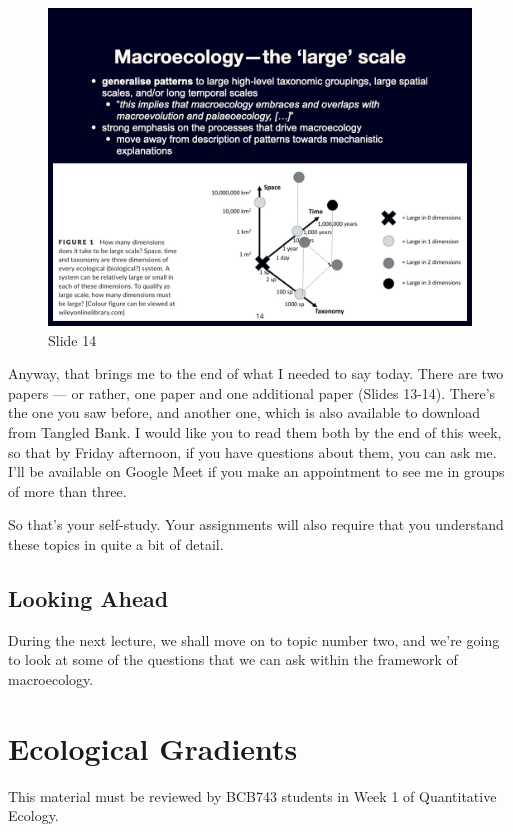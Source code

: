 \documentclass[
  11pt,
]{book}
\begin{document}
\begin{figure}[ht]
\centering
\includegraphics[width=0.8\linewidth]{../images/BDC334/BDC334-014.jpeg}
\caption*{Slide 14}
\end{figure}

Anyway, that brings me to the end of what I needed to say today. There
are two papers --- or rather, one paper and one additional paper (Slides
13-14). There's the one you saw before, and another one, which is also
available to download from Tangled Bank. I would like you to read them
both by the end of this week, so that by Friday afternoon, if you have
questions about them, you can ask me. I'll be available on Google Meet
if you make an appointment to see me in groups of more than three.

So that's your self-study. Your assignments will also require that you
understand these topics in quite a bit of detail.

\section{Looking Ahead}\label{looking-ahead}

During the next lecture, we shall move on to topic number two, and we're
going to look at some of the questions that we can ask within the
framework of macroecology.

\chapter{Ecological Gradients}\label{ecological-gradients}

\begin{tcolorbox}[enhanced jigsaw, arc=.35mm, titlerule=0mm, colframe=quarto-callout-note-color-frame, title=\textcolor{quarto-callout-note-color}{\faInfo}\hspace{0.5em}{BCB743}, colbacktitle=quarto-callout-note-color!10!white, opacityback=0, rightrule=.15mm, coltitle=black, left=2mm, bottomtitle=1mm, toptitle=1mm, toprule=.15mm, bottomrule=.15mm, leftrule=.75mm, opacitybacktitle=0.6, colback=white, breakable]

This material must be reviewed by BCB743 students in Week 1 of
Quantitative Ecology.

\end{tcolorbox}
\end{document}
